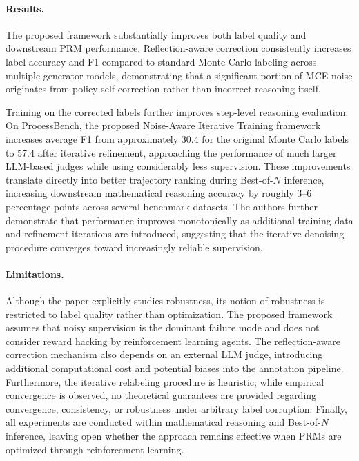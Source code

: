 \documentclass[11pt]{article}
\begin{document}
\paragraph{Results.}
The proposed framework substantially improves both label quality and downstream PRM performance. Reflection-aware correction consistently increases label accuracy and F1 compared to standard Monte Carlo labeling across multiple generator models, demonstrating that a significant portion of MCE noise originates from policy self-correction rather than incorrect reasoning itself.

Training on the corrected labels further improves step-level reasoning evaluation. On ProcessBench, the proposed Noise-Aware Iterative Training framework increases average F1 from approximately 30.4 for the original Monte Carlo labels to 57.4 after iterative refinement, approaching the performance of much larger LLM-based judges while using considerably less supervision. These improvements translate directly into better trajectory ranking during Best-of-\(N\) inference, increasing downstream mathematical reasoning accuracy by roughly 3--6 percentage points across several benchmark datasets. The authors further demonstrate that performance improves monotonically as additional training data and refinement iterations are introduced, suggesting that the iterative denoising procedure converges toward increasingly reliable supervision.

\paragraph{Limitations.}
Although the paper explicitly studies robustness, its notion of robustness is restricted to label quality rather than optimization. The proposed framework assumes that noisy supervision is the dominant failure mode and does not consider reward hacking by reinforcement learning agents. The reflection-aware correction mechanism also depends on an external LLM judge, introducing additional computational cost and potential biases into the annotation pipeline. Furthermore, the iterative relabeling procedure is heuristic; while empirical convergence is observed, no theoretical guarantees are provided regarding convergence, consistency, or robustness under arbitrary label corruption. Finally, all experiments are conducted within mathematical reasoning and Best-of-\(N\) inference, leaving open whether the approach remains effective when PRMs are optimized through reinforcement learning.
\end{document}
